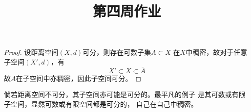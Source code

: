 \documentclass[cn]{homework}
\title{第四周作业}
\begin{document}
    \maketitle

    \problem
    \begin{proof}
        设距离空间$(X,d)$可分，则存在可数子集$A\subset X$
        在$X$中稠密，故对于任意子空间$(X',d)$，有
        \[X'\subset X\subset\bar A\]
        故$A$在子空间中亦稠密，因此子空间可分。
    \end{proof}

    倘若距离空间不可分，其子空间亦可能是可分的。最平凡的例子
    是其可数或有限子空间，显然可数或有限空间都是可分的，
    自己在自己中稠密。
\end{document}
